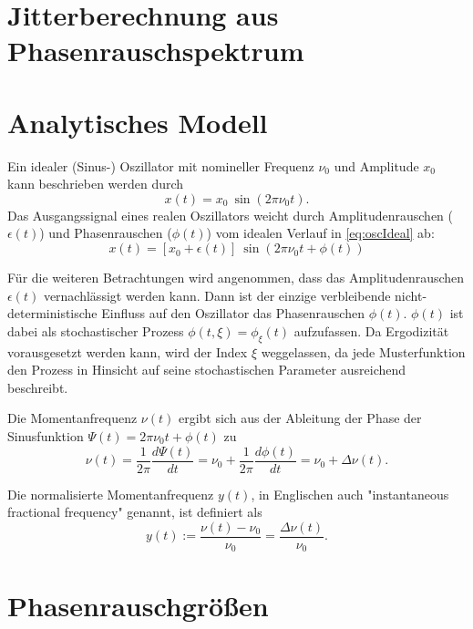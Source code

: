 \section{Jitterberechnung aus Phasenrauschspektrum}

\section{Analytisches Modell}
Ein idealer (Sinus-) Oszillator mit nomineller Frequenz $\nu_0$ und Amplitude $x_0$ kann beschrieben werden durch
\begin{equation}
\label{eq:oscIdeal}
	x(t)=x_0 \: \sin(2\pi \nu_0 t).
\end{equation}
Das Ausgangssignal eines realen Oszillators weicht durch Amplitudenrauschen ($\epsilon(t)$) und Phasenrauschen ($\phi(t)$) vom idealen Verlauf in \autoref{eq:oscIdeal} ab:
\begin{equation}
	x(t)=[x_0 + \epsilon(t)] \: \sin(2\pi \nu_0 t + \phi(t))
\end{equation}

Für die weiteren Betrachtungen wird angenommen, dass das Amplitudenrauschen $\epsilon(t)$ vernachlässigt werden kann. Dann ist der einzige verbleibende nicht-deterministische Einfluss auf den Oszillator das Phasenrauschen $\phi(t)$. $\phi(t)$ ist dabei als stochastischer Prozess $\phi(t,\xi)=\phi_\xi(t)$ aufzufassen. Da Ergodizität vorausgesetzt werden kann, wird der Index $\xi$ weggelassen, da jede Musterfunktion den Prozess in Hinsicht auf seine stochastischen Parameter ausreichend beschreibt.

Die Momentanfrequenz $\nu(t)$ ergibt sich aus der Ableitung der Phase der Sinusfunktion $\Psi(t)=2\pi \nu_0 t + \phi(t)$ zu
\begin{equation}
	\nu(t)=\frac{1}{2\pi} \frac{d\Psi(t)}{dt} = \nu_0 + \frac{1}{2\pi} \frac{d\phi(t)}{dt} = \nu_0 + \Delta\nu(t).
\end{equation}

Die normalisierte Momentanfrequenz $y(t)$, in Englischen auch "instantaneous fractional frequency" genannt, ist definiert als
\begin{equation}
	y(t):=\frac{\nu(t)-\nu_0}{\nu_0} = \frac{\Delta\nu(t)}{\nu_0}.
\end{equation}


\section{Phasenrauschgrößen}

